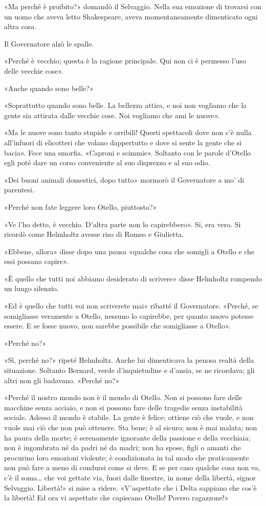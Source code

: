 \documentclass[
a5paper, %
10pt, %
twoside, 
onecolumn, %
openany, %
]{memoir}
\begin{document}
«Ma perché è proibito?» domandò il Selvaggio. Nella sua emozione di trovarsi con un uomo che aveva letto Shakespeare, aveva momentaneamente dimenticato ogni altra cosa.

Il Governatore alzò le spalle.

«Perché è vecchio; questa è la ragione principale. Qui non ci è permesso l’uso delle vecchie cose».

«Anche quando sono belle?»

«Soprattutto quando sono belle. La bellezza attira, e noi non vogliamo che la gente sia attirata dalle vecchie cose. Noi vogliamo che ami le nuove».

«Ma le nuove sono tanto stupide e orribili! Questi spettacoli dove non c’è nulla all’infuori di elicotteri che volano dappertutto e dove si sente la gente che si bacia». Fece una smorfia. «Caproni e scimmie». Soltanto con le parole d’Otello egli poté dare un corso conveniente al suo disprezzo e al suo odio.

«Dei buoni animali domestici, dopo tutto» mormorò il Governatore a mo’ di parentesi.

«Perché non fate leggere loro Otello, piuttosto?»

«Ve l’ho detto, è vecchio. D’altra parte non lo capirebbero». Si, era vero. Si ricordò come Helmholtz avesse riso di Romeo e Giulietta.

«Ebbene, allora» disse dopo una pausa «qualche cosa che somigli a Otello e che essi possano capire».

«È quello che tutti noi abbiamo desiderato di scrivere» disse Helmholtz rompendo un lungo silenzio.

«Ed è quello che tutti voi non scriverete mai» ribatté il Governatore. «Perché, se somigliasse veramente a Otello, nessuno lo capirebbe, per quanto nuovo potesse essere. E se fosse nuovo, non sarebbe possibile che somigliasse a Otello».

«Perché no?»

«Sì, perché no?» ripeté Helmholtz. Anche lui dimenticava la penosa realtà della situazione. Soltanto Bernard, verde d’inquietudine e d’ansia, se ne ricordava; gli altri non gli badavano. «Perché no?»

«Perché il nostro mondo non è il mondo di Otello. Non si possono fare delle macchine senza acciaio, e non si possono fare delle tragedie senza instabilità sociale. Adesso il mondo è stabile. La gente è felice; ottiene ciò che vuole, e non vuole mai ciò che non può ottenere. Sta bene; è al sicuro; non è mai malata; non ha paura della morte; è serenamente ignorante della passione e della vecchiaia; non è ingombrata né da padri né da madri; non ha spose, figli o amanti che procurino loro emozioni violente; è condizionata in tal modo che praticamente non può fare a meno di condursi come si deve. E se per caso qualche cosa non va, c’è il soma… che voi gettate via, fuori dalle finestre, in nome della libertà, signor Selvaggio. Libertà!» si mise a ridere. «V’aspettate che i Delta sappiano che cos’è la libertà! Ed ora vi aspettate che capiscano Otello! Povero ragazzone!»
\end{document}
